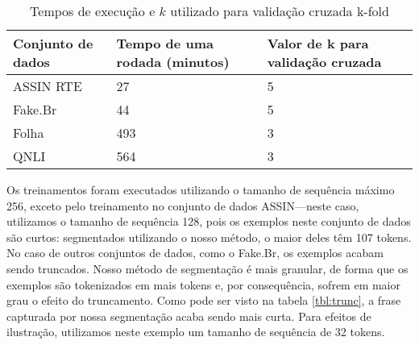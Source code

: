 \documentclass[cic,tc]{iiufrgs}
\begin{document}
\begin{table}[]
    \caption{Tempos de execução e $k$ utilizado para validação cruzada k-fold}
    \centering
        \begin{tabular}{lll}
        \hline
        Conjunto de dados & Tempo de uma rodada (minutos) & Valor de k para validação cruzada \\ \hline
        ASSIN RTE  & 27                  & 5                                 \\
        Fake.Br     & 44                  & 5                                 \\
        Folha       & 493                 & 3                                 \\
        QNLI        & 564                 & 3                                
        \end{tabular}
    \label{tbl:runtime}
\end{table}

Os treinamentos foram executados utilizando o tamanho de sequência máximo 256, exceto pelo treinamento no conjunto de dados ASSIN---neste caso, utilizamos o tamanho de sequência 128, pois os exemplos neste conjunto de dados são curtos: segmentados utilizando o nosso método, o maior deles têm 107 tokens. No caso de outros conjuntos de dados, como o Fake.Br, os exemplos acabam sendo truncados. Nosso método de segmentação é mais granular, de forma que os exemplos são tokenizados em mais tokens e, por consequência, sofrem em maior grau o efeito do truncamento. Como pode ser visto na tabela \ref{tbl:trunc}, a frase capturada por nossa segmentação acaba sendo mais curta. Para efeitos de ilustração, utilizamos neste exemplo um tamanho de sequência de 32 tokens.
\end{document}
